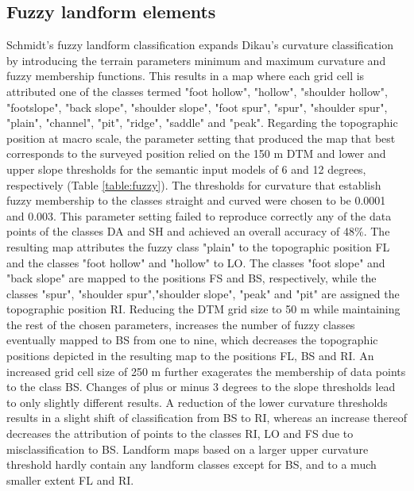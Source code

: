\documentclass[preprint,12pt,authoryear]{elsarticle}
\begin{document}
\subsection{Fuzzy landform elements}
Schmidt's fuzzy landform classification expands Dikau's curvature classification by introducing the terrain parameters minimum and maximum curvature and fuzzy membership functions. This results in a map where each grid cell is attributed one of the classes termed "foot hollow", "hollow", "shoulder hollow", "footslope", "back slope", "shoulder slope", "foot spur", "spur", "shoulder spur", "plain", "channel", "pit", "ridge", "saddle" and "peak".
Regarding the topographic position at macro scale, the parameter setting that produced the map that best corresponds to the surveyed position relied on the 150 m DTM and lower and upper slope thresholds for the semantic input models of 6 and 12 degrees, respectively (Table \ref{table:fuzzy}). The thresholds for curvature that establish fuzzy membership to the classes straight and curved were chosen to be 0.0001 and 0.003. This parameter setting failed to reproduce correctly any of the data points of the classes DA and SH and achieved an overall accuracy of 48\%. The resulting map attributes the fuzzy class "plain" to the topographic position FL and the classes "foot hollow" and "hollow" to LO. The classes "foot slope" and "back slope" are mapped to the positions FS and BS, respectively, while the classes "spur", "shoulder spur","shoulder slope", "peak" and "pit" are assigned the topographic position RI. Reducing the DTM grid size to 50 m while maintaining the rest of the chosen parameters, increases the number of fuzzy classes eventually mapped to BS from one to nine, which decreases the topographic positions depicted in the resulting map to the positions FL, BS and RI. An increased grid cell size of 250 m further exagerates the membership of data points to the class BS. Changes of plus or minus 3 degrees to the slope thresholds lead to only slightly different results. A reduction of the lower curvature thresholds results in a slight shift of classification from BS to RI, whereas an increase thereof decreases the attribution of points to the classes RI, LO and FS due to misclassification to BS. Landform maps based on a larger upper curvature threshold hardly contain any landform classes except for BS, and to a much smaller extent FL and RI.
\end{document}
